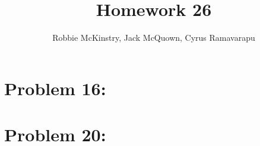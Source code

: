 \documentclass[12pt]{article}
\begin{document}
\title{Homework 26}
\author{Robbie McKinstry, Jack McQuown, Cyrus Ramavarapu}
\renewcommand{\today}{2 November 2016}
\renewcommand{\baselinestretch}{1.5}
\maketitle

\section*{Problem 16: }
\section*{Problem 20: }
\end{document}
